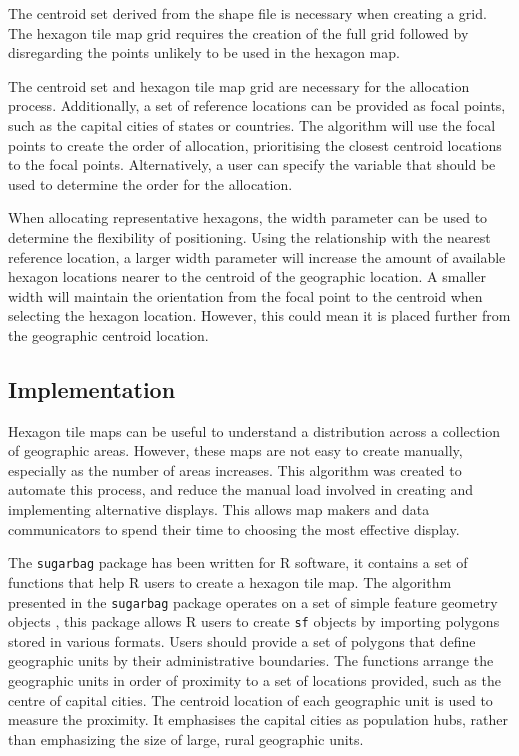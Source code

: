 The centroid set derived from the shape file is necessary when creating
a grid. The hexagon tile map grid requires the creation of the full grid
followed by disregarding the points unlikely to be used in the hexagon
map.

The centroid set and hexagon tile map grid are necessary for the
allocation process. Additionally, a set of reference locations can be
provided as focal points, such as the capital cities of states or
countries. The algorithm will use the focal points to create the order
of allocation, prioritising the closest centroid locations to the focal
points. Alternatively, a user can specify the variable that should be
used to determine the order for the allocation.

When allocating representative hexagons, the width parameter can be used
to determine the flexibility of positioning. Using the relationship with
the nearest reference location, a larger width parameter will increase
the amount of available hexagon locations nearer to the centroid of the
geographic location. A smaller width will maintain the orientation from
the focal point to the centroid when selecting the hexagon location.
However, this could mean it is placed further from the geographic
centroid location.

\hypertarget{implementation}{%
\subsection{Implementation}\label{implementation}}

Hexagon tile maps can be useful to understand a distribution across a
collection of geographic areas. However, these maps are not easy to
create manually, especially as the number of areas increases. This
algorithm was created to automate this process, and reduce the manual
load involved in creating and implementing alternative displays. This
allows map makers and data communicators to spend their time to choosing
the most effective display.

The \texttt{sugarbag} package has been written for R software, it
contains a set of functions that help R users to create a hexagon tile
map. The algorithm presented in the \texttt{sugarbag} package operates
on a set of simple feature geometry objects \citep{sf}, this package
allows R users to create \texttt{sf} objects by importing polygons
stored in various formats. Users should provide a set of polygons that
define geographic units by their administrative boundaries. The
functions arrange the geographic units in order of proximity to a set of
locations provided, such as the centre of capital cities. The centroid
location of each geographic unit is used to measure the proximity. It
emphasises the capital cities as population hubs, rather than
emphasizing the size of large, rural geographic units.

